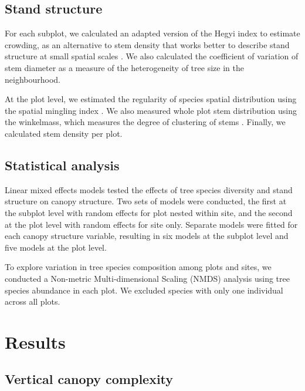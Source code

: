 \documentclass[11pt,a4paper]{article}
\begin{document}
\subsection{Stand structure}

For each subplot, we calculated an adapted version of the Hegyi index to estimate crowding, as an alternative to stem density that works better to describe stand structure at small spatial scales \citep{Hegyi1974}. We also calculated the coefficient of variation of stem diameter as a measure of the heterogeneity of tree size in the neighbourhood.

At the plot level, we estimated the regularity of species spatial distribution using the spatial mingling index \citep{Gadow2002}. We also measured whole plot stem distribution using the winkelmass, which measures the degree of clustering of stems \citep{}. Finally, we calculated stem density per plot.

\subsection{Statistical analysis}

Linear mixed effects models tested the effects of tree species diversity and stand structure on canopy structure. Two sets of models were conducted, the first at the subplot level with random effects for plot nested within site, and the second at the plot level with random effects for site only. Separate models were fitted for each canopy structure variable, resulting in six models at the subplot level and five models at the plot level.

To explore variation in tree species composition among plots and sites, we conducted a Non-metric Multi-dimensional Scaling (NMDS) analysis using tree species abundance in each plot. We excluded species with only one individual across all plots.  

\section{Results}

\subsection{Vertical canopy complexity}
\end{document}
